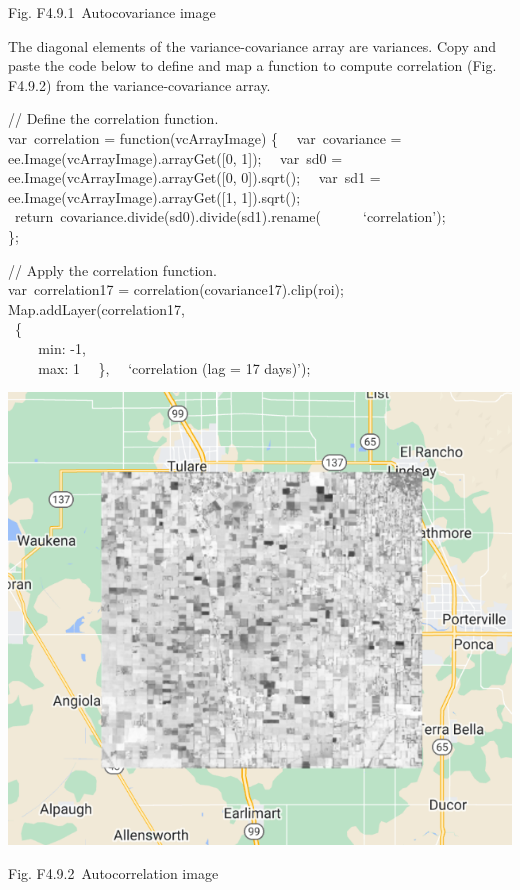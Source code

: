 \documentclass[
  letterpaper,
  DIV=11,
  numbers=noendperiod]{scrreprt}
\begin{document}
Fig. F4.9.1~Autocovariance image

The diagonal elements of the variance-covariance array are variances.
Copy and paste the code below to define and map a function to compute
correlation (Fig. F4.9.2) from the variance-covariance array.

// Define the correlation function.\\
var~correlation = function(vcArrayImage) \{~ ~var~covariance =
ee.Image(vcArrayImage).arrayGet({[}0, 1{]});~ ~var~sd0 =
ee.Image(vcArrayImage).arrayGet({[}0, 0{]}).sqrt();~ ~var~sd1 =
ee.Image(vcArrayImage).arrayGet({[}1, 1{]}).sqrt();~
~return~covariance.divide(sd0).divide(sd1).rename(~ ~ ~
~`correlation');\\
\};

// Apply the correlation function.\\
var~correlation17 = correlation(covariance17).clip(roi);\\
Map.addLayer(correlation17,\\
\hspace*{0.333em} ~\{\\
\hspace*{0.333em} ~ ~ ~min: -1,\\
\hspace*{0.333em} ~ ~ ~max: 1~ ~\},~ ~`correlation (lag = 17 days)');

\includegraphics{./F4/image33.png}

Fig. F4.9.2~Autocorrelation image
\end{document}

